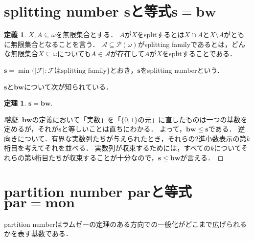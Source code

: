 \documentclass[uplatex,dvipdfmx]{jsarticle}
\renewcommand\subset{\subseteq}
\theoremstyle{definition}
\newtheorem*{thm*}{定理}
\newtheorem*{defi*}{定義}
\theoremstyle{named}
\begin{document}
\section{splitting number $\mathbf{s}$と等式$\mathbf{s} = \mathbf{bw}$}


\begin{framed}
\begin{defi*}
$X, A \subset \omega$を無限集合とする．
$A$が$X$をsplitするとは$X \cap A$と$X \setminus A$がともに無限集合となることを言う．
$\mathcal{A} \subset \mathcal{P}(\omega)$がsplitting familyであるとは，どんな無限集合$X \subset \omega$についても$A \in \mathcal{A}$が存在して$A$が$X$をsplitすることである．

$\mathbf{s} = \min \{|\mathcal{F}| : \text{$\mathcal{F}$はsplitting family} \}$とおき，$\mathbf{s}$をsplitting numberという．
\end{defi*}
\end{framed}

$\mathbf{s}$と$\mathbf{bw}$について次が知られている．

\begin{framed}
\begin{thm*}
$\mathbf{s} = \mathbf{bw}$.
\end{thm*}
\end{framed}
\begin{proof}[略証]
$\mathbf{bw}$の定義において「実数」を「$\{0, 1\}$の元」に直したものは一つの基数を定めるが，それが$\mathbf{s}$と等しいことは直ちにわかる．
よって，$\mathbf{bw} \le \mathbf{s}$である．
逆向きについて．有界な実数列たちが与えられたとき，それらの$2$進小数表示の第$k$桁目を考えてそれを並べる．
実数列が収束するためには，すべての$k$についてそれらの第$k$桁目たちが収束することが十分なので，$\mathbf{s} \le \mathbf{bw}$が言える．
\end{proof}

\section{partition number $\mathbf{par}$と等式$\mathbf{par} = \mathbf{mon}$}

partition numberはラムゼーの定理のある方向での一般化がどこまで広げられるかを表す基数である．
\end{document}
